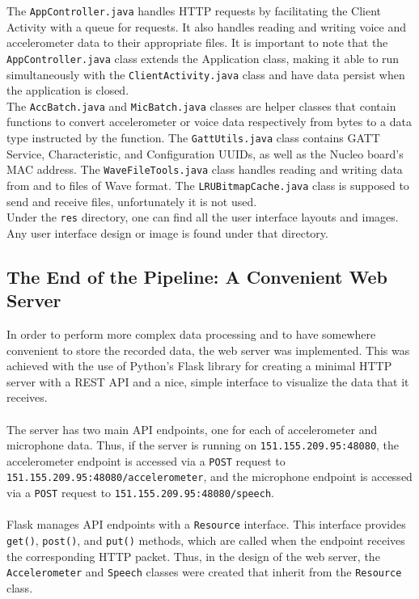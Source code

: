 The \texttt{AppController.java} handles HTTP requests by facilitating the Client Activity with a queue for requests. It also handles reading and writing voice and accelerometer data to their appropriate files. It is important to note that the \texttt{AppController.java} class extends the Application class, making it able to run simultaneously with the \texttt{ClientActivity.java} class and have data persist when the application is closed.\\

The \texttt{AccBatch.java} and \texttt{MicBatch.java} classes are helper classes that contain functions to convert accelerometer or voice data respectively from bytes to a data type instructed by the function. The \texttt{GattUtils.java} class contains GATT Service, Characteristic, and Configuration UUIDs, as well as the Nucleo board's MAC address. The \texttt{WaveFileTools.java} class handles reading and writing data from and to files of Wave format. The \texttt{LRUBitmapCache.java} class is supposed to send and receive files, unfortunately it is not used.\\

Under the \texttt{res} directory, one can find all the user interface layouts and images. Any user interface design or image is found under that directory. 
\subsection{The End of the Pipeline: A Convenient Web Server}
In order to perform more complex data processing and to have somewhere convenient to store the
recorded data, the web server was implemented. This was achieved with the use of Python's Flask
library for creating a minimal HTTP server with a REST API and a nice, simple interface to visualize
the data that it receives.\\\\
The server has two main API endpoints, one for each of accelerometer and microphone data. Thus, if
the server is running on \texttt{151.155.209.95:48080}, the accelerometer endpoint is accessed via a
\texttt{POST} request to \texttt{151.155.209.95:48080/accelerometer}, and the microphone endpoint is
accessed via a \texttt{POST} request to \texttt{151.155.209.95:48080/speech}.\\\\
Flask manages API endpoints with a \texttt{Resource} interface. This interface provides
\texttt{get()}, \texttt{post()}, and \texttt{put()} methods, which are called when the endpoint
receives the corresponding HTTP packet. Thus, in the design of the web server, the
\texttt{Accelerometer} and \texttt{Speech} classes were created that inherit from the
\texttt{Resource} class.
